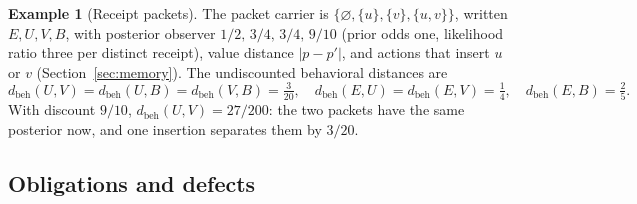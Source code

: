 \documentclass[11pt]{article}
\newcommand{\dbeh}{d_{\mathrm{beh}}}
\theoremstyle{definition}
\newtheorem{example}[definition]{Example}
\theoremstyle{plain}
\begin{document}
\begin{example}[Receipt packets]\label{ex:packets}
The packet carrier is $\{\varnothing,\{u\},\{v\},\{u,v\}\}$, written $E,U,V,B$, with posterior
observer $1/2,\,3/4,\,3/4,\,9/10$ (prior odds one, likelihood ratio three per distinct receipt),
value distance $|p-p'|$, and actions that insert $u$ or $v$ (Section~\ref{sec:memory}). The
undiscounted behavioral distances are
\[
\dbeh(U,V)=\dbeh(U,B)=\dbeh(V,B)=\tfrac{3}{20},\quad \dbeh(E,U)=\dbeh(E,V)=\tfrac14,\quad
\dbeh(E,B)=\tfrac25 .
\]
With discount $9/10$, $\dbeh(U,V)=27/200$: the two packets have the same posterior now, and one
insertion separates them by $3/20$.
\end{example}

\subsection{Obligations and defects}\label{sec:obligations}
\end{document}
